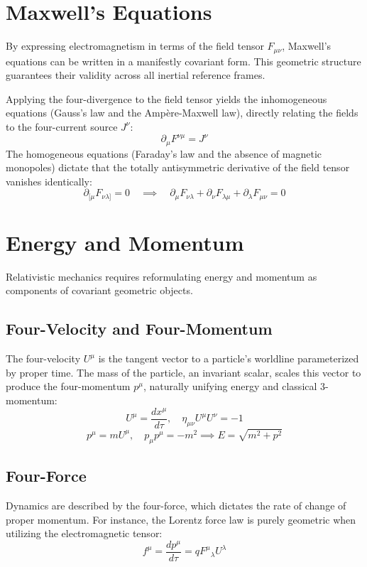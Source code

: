 \documentclass[11pt, a4paper]{report}
\begin{document}
\section{Maxwell's Equations}
By expressing electromagnetism in terms of the field tensor $F_{\mu\nu}$, Maxwell's equations can be written in a manifestly covariant form. This geometric structure guarantees their validity across all inertial reference frames.

Applying the four-divergence to the field tensor yields the inhomogeneous equations (Gauss's law and the Ampère-Maxwell law), directly relating the fields to the four-current source $J^\nu$:
\begin{equation}\label{eq:inhom-maxwell}
\partial_\mu F^{\nu\mu} = J^\nu
\end{equation}
The homogeneous equations (Faraday's law and the absence of magnetic monopoles) dictate that the totally antisymmetric derivative of the field tensor vanishes identically:
\begin{equation}\label{eq:hom-maxwell}
\partial_{[\mu} F_{\nu\lambda]} = 0 \quad \implies \quad \partial_\mu F_{\nu\lambda} + \partial_\nu F_{\lambda\mu} + \partial_\lambda F_{\mu\nu} = 0
\end{equation}

\section{Energy and Momentum}
Relativistic mechanics requires reformulating energy and momentum as components of covariant geometric objects. 

\subsection*{Four-Velocity and Four-Momentum}
The four-velocity $U^\mu$ is the tangent vector to a particle's worldline parameterized by proper time. The mass of the particle, an invariant scalar, scales this vector to produce the four-momentum $p^\mu$, naturally unifying energy and classical 3-momentum:
\begin{equation}
U^\mu = \frac{dx^\mu}{d\tau}, \quad \eta_{\mu\nu}U^\mu U^\nu = -1
\end{equation}
\begin{equation}
p^\mu = mU^\mu, \quad p_\mu p^\mu = -m^2 \implies E = \sqrt{m^2 + p^2}
\end{equation}

\subsection*{Four-Force}
Dynamics are described by the four-force, which dictates the rate of change of proper momentum. For instance, the Lorentz force law is purely geometric when utilizing the electromagnetic tensor:
\begin{equation}
f^\mu = \frac{dp^\mu}{d\tau} = q {F^\mu}_\lambda U^\lambda
\end{equation}
\end{document}
